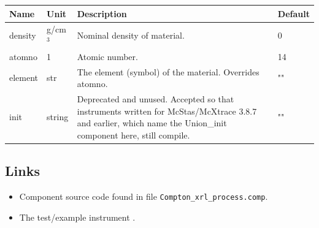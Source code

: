 \begin{longtable}{p{}p{}p{}p{}}
\toprule
\textbf{Name} & \textbf{Unit} & \textbf{Description} & \textbf{Default} \\
\midrule
\endhead
density & g/cm$^{3}$ & Nominal density of material. & 0 \\
atomno & 1 & Atomic number. & 14 \\
element & str & The element (symbol) of the material. Overrides atomno. & "" \\
init & string & Deprecated and unused. Accepted so that instruments written for McStas/McXtrace 3.8.7 and earlier, which name the Union\_init component here, still compile. & "" \\
\bottomrule
\end{longtable}

\subsection*{Links}
\begin{itemize}
  \item Component source code found in file \texttt{Compton\_xrl\_process.comp}.
  \item The test/example instrument .
\end{itemize}
